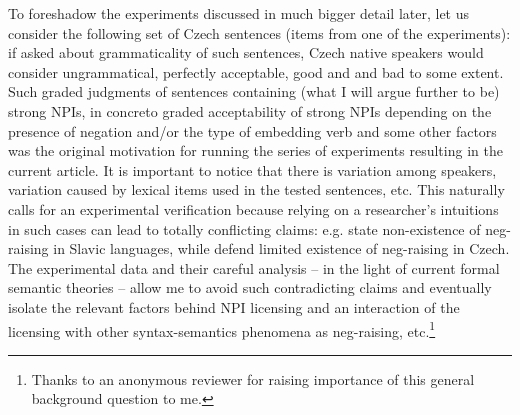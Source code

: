 \documentclass[output=paper,
]{langscibook}
\begin{document}
To foreshadow the experiments discussed in much bigger detail later, let us consider the following set of Czech sentences (items from one of the experiments): if asked about grammaticality of such sentences, Czech native speakers would consider  ungrammatical,  perfectly acceptable,  good and  and  bad to some extent. Such graded judgments of sentences containing (what I will argue further to be) strong NPIs, in concreto graded acceptability of strong NPIs depending on the presence of negation and/or the type of embedding verb and some other factors was the original motivation for running the series of experiments resulting in the current article. It is important to notice that there is variation among speakers, variation caused by lexical items used in the tested sentences, etc. This naturally calls for an experimental verification because relying on a researcher's intuitions in such cases can lead to totally conflicting claims: e.g. \cite{Boskovic2011} state non-existence of neg-raising in Slavic languages, while \cite{dovcekal2016experimentala} defend limited existence of neg-raising in Czech. The experimental data and their careful analysis -- in the light of current formal semantic theories -- allow me to avoid such contradicting claims and eventually isolate the relevant factors behind NPI licensing and an interaction of the licensing with other syntax-semantics phenomena as neg-raising, etc.\footnote{Thanks to an anonymous reviewer for raising importance of this general background question to me.}

\ea \label{ex-2-5} 

\z
\z
\end{document}
